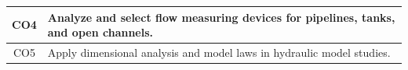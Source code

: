 \documentclass[12pt, a4paper]{article}
\begin{document}
\begin{center}
\begin{tabularx}{\textwidth}{|c|X|}
                                                                                                                                                                                                                                                                                                                                                                                                                                                                                                                                                                                                                                                                                                                    \hline
                                                                                                                                                                                                                                                                                                                                                                                                                                                                                                                                                                                                                                                                                                                            CO4 & Analyze and select flow measuring devices for pipelines, tanks, and open channels. \\
                                                                                                                                                                                                                                                                                                                                                                                                                                                                                                                                                                                                                                                                                                                                    \hline
                                                                                                                                                                                                                                                                                                                                                                                                                                                                                                                                                                                                                                                                                                                                            CO5 & Apply dimensional analysis and model laws in hydraulic model studies. \\

\end{tabularx}
\end{center}
\end{document}
